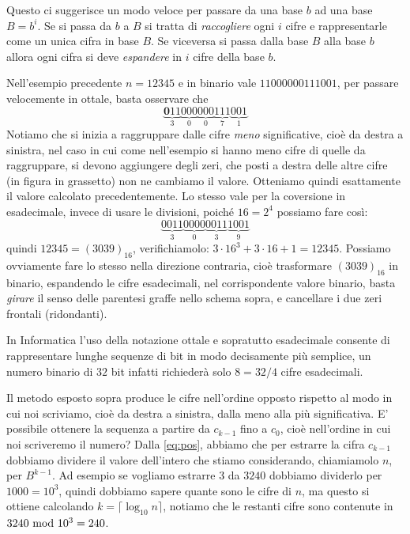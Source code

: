 Questo ci suggerisce un modo veloce per passare da una base $b$ ad una base $B=b^i$. Se si passa da $b$ a $B$ si tratta di \emph{raccogliere} ogni $i$ cifre e rappresentarle come un unica cifra in base $B$. Se viceversa si passa dalla base $B$ alla base $b$ allora ogni cifra si deve \emph{espandere} in $i$
cifre della base $b$.

\begin{ex}
Nell'esempio precedente $n=12345$ e in binario vale $11000000111001$, per passare velocemente in ottale, basta osservare che
\[
\underbrace{\mathbf{0}11}_{3}\underbrace{000}_{0}\underbrace{000}_{0}\underbrace{111}_{7}\underbrace{001}_{1}
\]
\noindent Notiamo che si inizia a raggruppare dalle cifre \emph{meno} significative, cioè da destra a sinistra, nel caso in cui come nell'esempio si hanno meno cifre di quelle da raggruppare, si devono aggiungere degli zeri, che posti a destra delle altre cifre (in figura in grassetto) non ne cambiamo il valore. Otteniamo
quindi esattamente il valore calcolato precedentemente. Lo stesso vale per la coversione in esadecimale, invece di usare le divisioni, poiché $16 = 2^4$ possiamo fare così:
\[
\underbrace{0011}_{3}\underbrace{0000}_{0}\underbrace{0011}_{3}\underbrace{1001}_{9}
\]
quindi $12345 = (3039)_{16}$, verifichiamolo: $3\cdot{16}^3+3\cdot{16}+1 = 12345$. Possiamo ovviamente fare lo stesso nella direzione contraria, cioè trasformare $(3039)_{16}$ in binario, espandendo le cifre esadecimali, nel corrispondente valore binario, basta \emph{girare} il senso delle parentesi graffe nello schema sopra, e cancellare i due zeri frontali (ridondanti).
\end{ex}

In Informatica l'uso della notazione ottale e sopratutto esadecimale consente
di rappresentare lunghe sequenze di bit in modo decisamente più semplice, un
numero binario di $32$ bit infatti richiederà solo $8 = 32/4$ cifre esadecimali.


Il metodo esposto sopra produce le cifre nell'ordine opposto rispetto al modo in cui noi scriviamo,  
cioè da destra a sinistra, dalla meno alla più significativa. E' possibile ottenere la sequenza a partire da $c_{k-1}$ fino
a $c_0$, cioè nell'ordine in cui noi scriveremo il numero? Dalla \eqref{eq:pos},
abbiamo che per estrarre la cifra $c_{k-1}$ dobbiamo dividere il valore dell'intero che stiamo considerando, chiamiamolo $n$, per $B^{k-1}$. Ad esempio
se vogliamo estrarre $3$ da $3240$ dobbiamo dividerlo per $1000 = 10^3$, quindi dobbiamo sapere quante sono le cifre di $n$, ma questo si ottiene calcolando
$k = \lceil \log_{10} n \rceil$, notiamo che le restanti cifre sono contenute in $3240 \ \text{mod}\ 10^3 = 240$.

